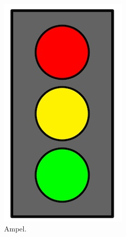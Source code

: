 \begin{figure}[htb]
\centering
\begin{minipage}{0.3\textwidth}
\centering
\includegraphics[scale=0.25]{ampel}
\caption{Ampel.}
\label{figure-ampel}
\end{minipage}
\hfill
\begin{minipage}{0.3\textwidth}
\centering

\end{minipage}
\end{figure}

